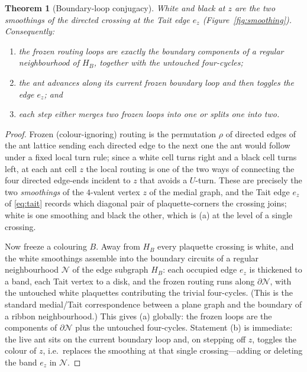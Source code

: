 \documentclass[11pt,letterpaper]{article}
\theoremstyle{plain}
\newtheorem{theorem}{Theorem}[section]
\theoremstyle{definition}
\begin{document}
\begin{NoHyper}
\begin{theorem}[Boundary-loop conjugacy]\label{thm:conjugacy}
White and black at $z$ are the two smoothings of the directed crossing at the Tait
edge $e_z$ \textup{(Figure~\ref{fig:smoothing})}. Consequently:
\begin{enumerate}[label=\textup{(\alph*)}]
\item the frozen routing loops are exactly the boundary components of a regular
neighbourhood of $H_B$, together with the untouched four-cycles;
\item the ant advances along its current frozen boundary loop and then toggles the
edge $e_z$; and
\item each step either merges two frozen loops into one or splits one into two.
\end{enumerate}
\end{theorem}

\begin{proof}
Frozen (colour-ignoring) routing is the permutation $\rho$ of directed edges of the
ant lattice sending each directed edge to the next one the ant would follow under a
fixed local turn rule; since a white cell turns right and a black cell turns left, at
each ant cell $z$ the local routing is one of the two ways of connecting the four
directed edge-ends incident to $z$ that avoids a $U$-turn. These are precisely the two
\emph{smoothings} of the $4$-valent vertex $z$ of the medial graph, and the Tait edge
$e_z$ of \eqref{eq:tait} records which diagonal pair of plaquette-corners the crossing
joins; white is one smoothing and black the other, which is (a) at the level of a
single crossing.

Now freeze a colouring $B$. Away from $H_B$ every plaquette crossing is white, and the
white smoothings assemble into the boundary circuits of a regular neighbourhood $\mathcal{N}$
of the edge subgraph $H_B$: each occupied edge $e_z$ is thickened to a band, each Tait
vertex to a disk, and the frozen routing runs along $\partial\mathcal{N}$, with the untouched
white plaquettes contributing the trivial four-cycles. (This is the standard medial/Tait
correspondence between a plane graph and the boundary of a ribbon neighbourhood.) This
gives (a) globally: the frozen loops are the components of $\partial\mathcal{N}$ plus the
untouched four-cycles. Statement (b) is immediate: the live ant sits on the current
boundary loop and, on stepping off $z$, toggles the colour of $z$, i.e.\ replaces the
smoothing at that single crossing---adding or deleting the band $e_z$ in $\mathcal{N}$.


\end{proof}
\end{NoHyper}
\end{document}
